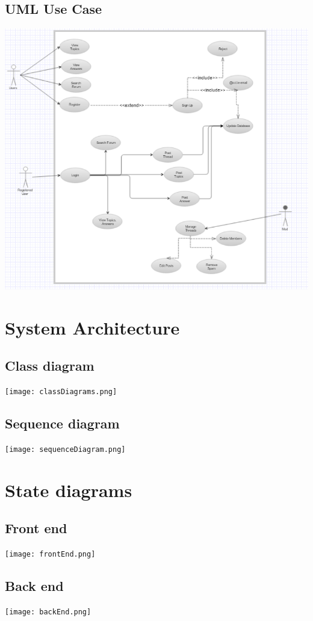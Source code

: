 \documentclass[a4paper, 12pt]{article}
\begin{document}
		\subsection{UML Use Case}
			\includegraphics[width=\textwidth]{UMLUseCase.png}
	\section{System Architecture}
		\subsection{Class diagram}
			\texttt{[image: classDiagrams.png]}
		\subsection{Sequence diagram}
			\texttt{[image: sequenceDiagram.png]}
	\section{State diagrams}
		\subsection{Front end}
			\texttt{[image: frontEnd.png]}

		\subsection{Back end}
			\texttt{[image: backEnd.png]}
\end{document}
